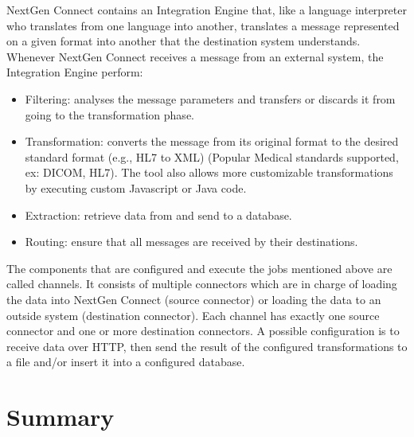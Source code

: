 NextGen Connect contains an Integration Engine that, like a language interpreter who translates from one language into another, translates a message represented on a given format into another that the destination system understands.
Whenever NextGen Connect receives a message from an external system, the Integration Engine perform:
\begin{itemize}
    \item Filtering: analyses the message parameters and transfers or discards it from going to the transformation phase.
    \item Transformation: converts the message from its original format to the desired standard format (e.g., HL7 to XML) (Popular Medical standards supported, ex: DICOM, HL7). The tool also allows more customizable transformations by executing custom Javascript or Java code.
    \item Extraction: retrieve data from and send to a database.
    \item Routing: ensure that all messages are received by their destinations.
\end{itemize}
The components that are configured and execute the jobs mentioned above are called channels.
It consists of multiple connectors which are in charge of loading the data into NextGen Connect (source connector) or loading the data to an outside system (destination connector).
Each channel has exactly one source connector and one or more destination connectors.
A possible configuration is to receive data over HTTP, then send the result of the configured transformations to a file and/or insert it into a configured database.

\section{Summary}

